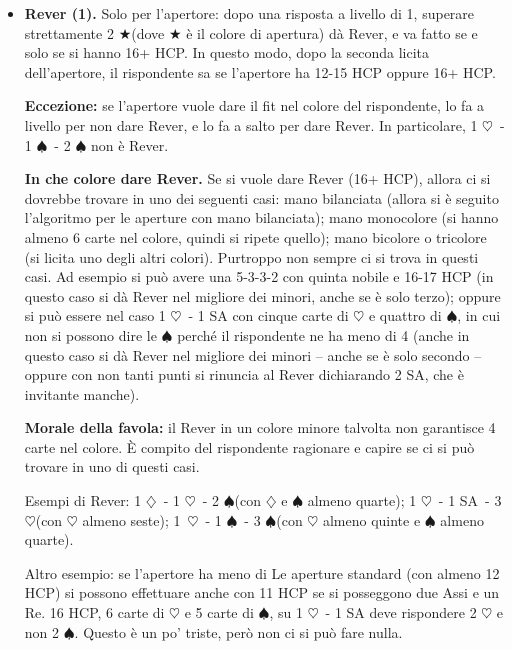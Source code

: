 \documentclass[a4paper,10pt]{article}
\renewcommand{\c}{$\clubsuit$\xspace}
\renewcommand{\d}{$\diamondsuit$\xspace}
\newcommand{\h}{$\heartsuit$\xspace}
\newcommand{\s}{$\spadesuit$\xspace}
\renewcommand{\j}{$\bigstar$\xspace}
\newcommand{\sa}{SA\xspace}
\begin{document}
\begin{itemize}
 Se l'apertore ha 4\c\ - 4\d\ - 4\h\ - 1\s e ha aperto di 1 \c (quindi ha 16+ HCP, vedi apertura tricolore), sulla risposta di 1 \d dichiara 2 \h (Rever, \h quarte) e non 3 \d (Rever, fit a \d).
 Il fit a \d può essere dato dopo, nel caso in cui non si trovi fit a \h.
 
 \item {\bf Rever (1).} Solo per l'apertore: dopo una risposta a livello di 1, superare strettamente 2 \j (dove \j è il colore di apertura) dà Rever, e va fatto se e solo se si hanno 16+ HCP.
 In questo modo, dopo la seconda licita dell'apertore, il rispondente sa se l'apertore ha 12-15 HCP oppure 16+ HCP.
 
 {\bf Eccezione:} se l'apertore vuole dare il fit nel colore del rispondente, lo fa a livello per non dare Rever, e lo fa a salto per dare Rever. In particolare, 1 \h\ - 1 \s\ - 2 \s non è Rever.
 
 {\bf In che colore dare Rever.} Se si vuole dare Rever (16+ HCP), allora ci si dovrebbe trovare in uno dei seguenti casi: mano bilanciata (allora si è seguito l'algoritmo per le aperture con mano bilanciata); mano monocolore (si hanno almeno 6 carte nel colore, quindi si ripete quello); mano bicolore o tricolore (si licita uno degli altri colori). Purtroppo non sempre ci si trova in questi casi.
 Ad esempio si può avere una 5-3-3-2 con quinta nobile e 16-17 HCP (in questo caso si dà Rever nel migliore dei minori, anche se è solo terzo);
 oppure si può essere nel caso 1 \h\ - 1 \sa con cinque carte di \h e quattro di \s, in cui non si possono dire le \s perché il rispondente ne ha meno di 4 (anche in questo caso si dà Rever nel migliore dei minori -- anche se è solo secondo -- oppure con non tanti punti si rinuncia al Rever dichiarando 2 \sa, che è invitante manche).
 
 {\bf Morale della favola:} il Rever in un colore minore talvolta non garantisce 4 carte nel colore. È compito del rispondente ragionare e capire se ci si può trovare in uno di questi casi.
 
 Esempi di Rever: 1 \d\ - 1 \h\ - 2 \s (con \d e \s almeno quarte); 1 \h\ - 1 \sa\ - 3 \h (con \h almeno seste); \hbox{1 \h}\ - 1 \s\ - 3 \s (con \h almeno quinte e \s almeno quarte).
 
 Altro esempio: se l'apertore ha meno di
\noindent Le aperture standard (con almeno 12 HCP) si possono effettuare anche con 11 HCP se si posseggono due Assi e un Re.
 16 HCP, 6 carte di \h e 5 carte di \s, su 1 \h\ - 1 \sa deve rispondere 2 \h e non 2 \s. Questo è un po' triste, però non ci si può fare nulla.
 

\end{itemize}
\end{document}
